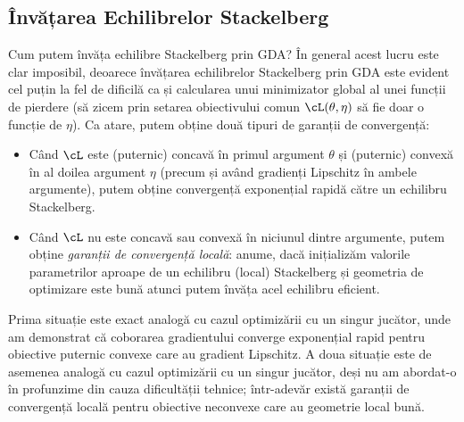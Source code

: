 \documentclass[../../book-main_ro.tex]{subfiles}
\begin{document}
\subsection{Învățarea Echilibrelor Stackelberg}

Cum putem învăța echilibre Stackelberg prin GDA? În general acest lucru este clar imposibil, deoarece învățarea echilibrelor Stackelberg prin GDA este evident cel puțin la fel de dificilă ca și calcularea unui minimizator global al unei funcții de pierdere (să zicem prin setarea obiectivului comun \(\cL(\theta, \eta)\) să fie doar o funcție de \(\eta\)). Ca atare, putem obține două tipuri de garanții de convergență:
\begin{itemize}
    \item Când \(\cL\) este (puternic) concavă în primul argument \(\theta\) și (puternic) convexă în al doilea argument \(\eta\) (precum și având gradienți Lipschitz în ambele argumente), putem obține convergență exponențial rapidă către un echilibru Stackelberg.
    \item Când \(\cL\) nu este concavă sau convexă în niciunul dintre argumente, putem obține \textit{garanții de convergență locală}: anume, dacă inițializăm valorile parametrilor aproape de un echilibru (local) Stackelberg și geometria de optimizare este bună atunci putem învăța acel echilibru eficient. 
\end{itemize}

Prima situație este exact analogă cu cazul optimizării cu un singur jucător, unde am demonstrat că coborarea gradientului converge exponențial rapid pentru obiective puternic convexe care au gradient Lipschitz. A doua situație este de asemenea analogă cu cazul optimizării cu un singur jucător, deși nu am abordat-o în profunzime din cauza dificultății tehnice; într-adevăr există garanții de convergență locală pentru obiective neconvexe care au geometrie local bună.
\end{document}
